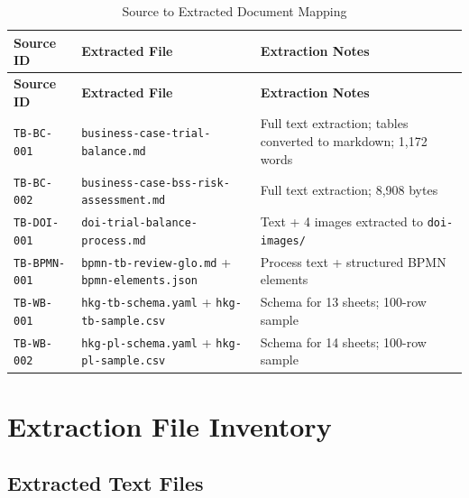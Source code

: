 \documentclass[11pt,a4paper,twoside]{report}
\newcommand{\srcref}[1]{\texttt{#1}}
\begin{document}
\begin{longtable}{@{}C{2cm}L{5cm}L{6.5cm}@{}}
\caption{Source to Extracted Document Mapping}
\label{tab:extracted-mapping} \\
\toprule
\textbf{Source ID} & \textbf{Extracted File} & \textbf{Extraction Notes} \\
\midrule
\endfirsthead
\toprule
\textbf{Source ID} & \textbf{Extracted File} & \textbf{Extraction Notes} \\
\midrule
\endhead
\srcref{TB-BC-001} & \texttt{business-case-trial-balance.md} & Full text extraction; tables converted to markdown; 1,172 words \\
\srcref{TB-BC-002} & \texttt{business-case-bss-risk-assessment.md} & Full text extraction; 8,908 bytes \\
\srcref{TB-DOI-001} & \texttt{doi-trial-balance-process.md} & Text + 4 images extracted to \texttt{doi-images/} \\
\srcref{TB-BPMN-001} & \texttt{bpmn-tb-review-glo.md} + \texttt{bpmn-elements.json} & Process text + structured BPMN elements \\
\srcref{TB-WB-001} & \texttt{hkg-tb-schema.yaml} + \texttt{hkg-tb-sample.csv} & Schema for 13 sheets; 100-row sample \\
\srcref{TB-WB-002} & \texttt{hkg-pl-schema.yaml} + \texttt{hkg-pl-sample.csv} & Schema for 14 sheets; 100-row sample \\
\bottomrule
\end{longtable}

\section{Extraction File Inventory}
\label{sec:extraction-inventory}

\subsection{Extracted Text Files}
\end{document}
